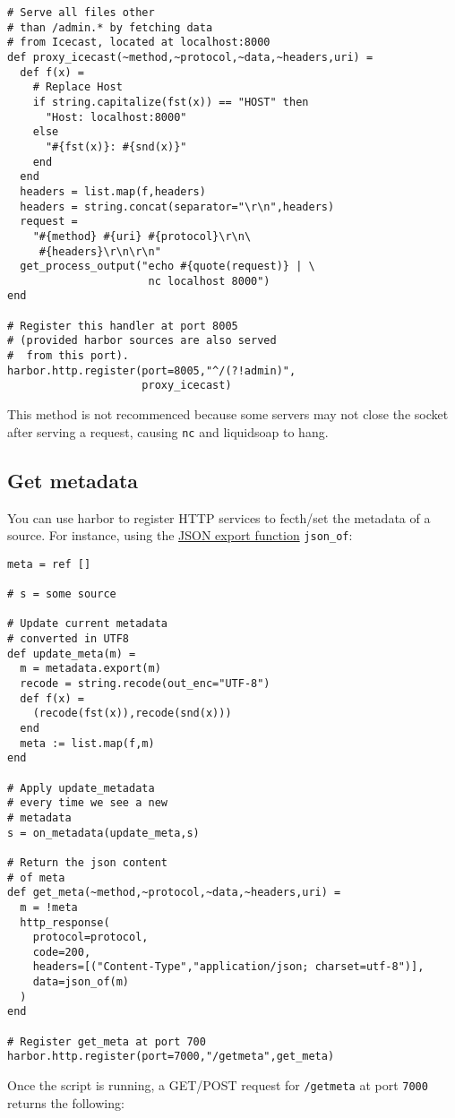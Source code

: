 \begin{verbatim}
# Serve all files other
# than /admin.* by fetching data
# from Icecast, located at localhost:8000
def proxy_icecast(~method,~protocol,~data,~headers,uri) =
  def f(x) =
    # Replace Host
    if string.capitalize(fst(x)) == "HOST" then
      "Host: localhost:8000"
    else
      "#{fst(x)}: #{snd(x)}"
    end
  end
  headers = list.map(f,headers)
  headers = string.concat(separator="\r\n",headers)
  request = 
    "#{method} #{uri} #{protocol}\r\n\
     #{headers}\r\n\r\n"
  get_process_output("echo #{quote(request)} | \
                      nc localhost 8000")
end

# Register this handler at port 8005
# (provided harbor sources are also served
#  from this port).
harbor.http.register(port=8005,"^/(?!admin)",
                     proxy_icecast)
\end{verbatim}
This method is not recommenced because some servers may not
close the socket after serving a request, causing \verb+nc+ and
liquidsoap to hang.

\subsection{Get metadata}
You can use harbor to register HTTP services to 
fecth/set the metadata of a source. For instance, 
using the \href{json.html}{JSON export function} \verb+json_of+:

\begin{verbatim}
meta = ref []

# s = some source

# Update current metadata
# converted in UTF8
def update_meta(m) =
  m = metadata.export(m)
  recode = string.recode(out_enc="UTF-8")
  def f(x) =
    (recode(fst(x)),recode(snd(x)))
  end
  meta := list.map(f,m)
end

# Apply update_metadata
# every time we see a new
# metadata
s = on_metadata(update_meta,s)

# Return the json content
# of meta
def get_meta(~method,~protocol,~data,~headers,uri) =
  m = !meta
  http_response(
    protocol=protocol,
    code=200,
    headers=[("Content-Type","application/json; charset=utf-8")],
    data=json_of(m)
  )
end

# Register get_meta at port 700
harbor.http.register(port=7000,"/getmeta",get_meta)
\end{verbatim}
Once the script is running, 
a GET/POST request for \verb+/getmeta+ at port \verb+7000+
returns the following:

